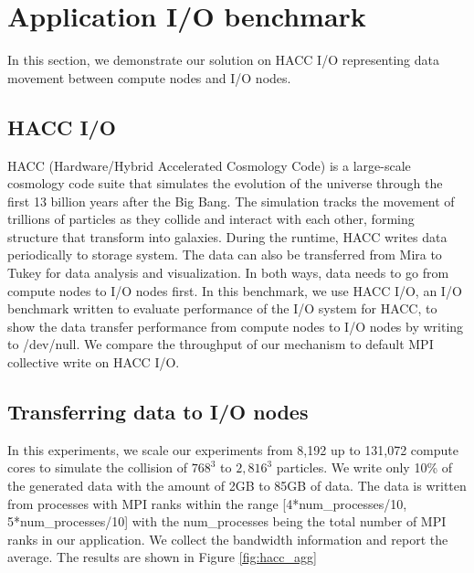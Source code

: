 \section{Application I/O benchmark}
\label{sec:app_benchmarks}
In this section, we demonstrate our solution on HACC I/O representing data movement between compute nodes and I/O nodes.

\subsection {HACC I/O}
HACC (Hardware/Hybrid Accelerated Cosmology Code) \cite{Habib:HACC} is a large-scale cosmology code suite that simulates the evolution of the universe through the first 13 billion years after the Big Bang. The simulation tracks the movement of trillions of particles as they collide and interact with each other, forming structure that transform into galaxies. During the runtime, HACC writes data periodically to storage system. The data can also be transferred from Mira to Tukey for data analysis and visualization. In both ways, data needs to go from compute nodes to I/O nodes first. In this benchmark, we use HACC I/O, an I/O benchmark written to evaluate performance of the I/O system for HACC, to show the data transfer performance from compute nodes to I/O nodes by writing to /dev/null. We compare the throughput of our mechanism to default MPI collective write on HACC I/O.

\subsection{Transferring data to I/O nodes}
In this experiments, we scale our experiments from 8,192 up to 131,072 compute cores to simulate the collision of $768^3$ to $2,816^3$ particles. We write only 10\% of the generated data with the amount of 2GB to 85GB of data. The data is written from processes with MPI ranks within the range [4*num\_processes/10, 5*num\_processes/10] with the num\_processes being the total number of MPI ranks in our application. We collect the bandwidth information and report the average. The results are shown in Figure \ref{fig:hacc_agg}

